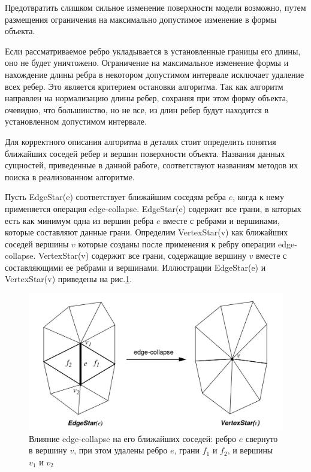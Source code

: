 \documentclass[14pt]{article}
\numberwithin{figure}{section}
\numberwithin{equation}{section}
\begin{document}
Предотвратить слишком сильное изменение поверхности модели возможно, путем размещения ограничения на максимально допустимое изменение в формы объекта.

Если рассматриваемое ребро укладывается в установленные границы его длины, оно не будет уничтожено. Ограничение на максимальное изменение формы и нахождение длины ребра в некотором допустимом интервале исключает удаление всех ребер. Это является критерием остановки алгоритма. Так как алгоритм направлен на нормализацию длины ребер, сохраняя при этом форму объекта, очевидно, что большинство, но не все, из длин ребер будут находится в установленном допустимом интервале.

Для корректного описания алгоритма в деталях стоит определить понятия ближайших соседей ребер и вершин поверхности объекта. Названия данных сущностей, приведенные в данной работе, соответствуют названиям методов их поиска в реализованном алгоритме.

Пусть EdgeStar(e) соответствует ближайшим соседям ребра $e$, когда к нему применяется операция edge-collapse. EdgeStar(e) содержит все грани, в которых есть как минимум одна из вершин ребра $e$ вместе с ребрами и вершинами, которые составляют данные грани. Определим VertexStar(v) как ближайших соседей вершины $v$ которые созданы после применения к ребру операции edge-collapse. VertexStar(v) содержит все грани, содержащие вершину $v$ вместе с составляющими ее ребрами и вершинами. Иллюстрации EdgeStar(e) и VertexStar(v) приведены на рис.\ref{ris:mc2}.

\begin{figure}
	\begin{center}
		\includegraphics[scale = 0.3]{mc2.JPG}
		\caption{Влияние edge-collapse на его ближайших соседей: ребро $e$ свернуто в вершину $v$, при этом удалены ребро $e$, грани $f_1$ и $f_2$, и вершины $v_1$ и $v_2$}
		\label{ris:mc2}
	\end{center}
\end{figure}
\end{document}
